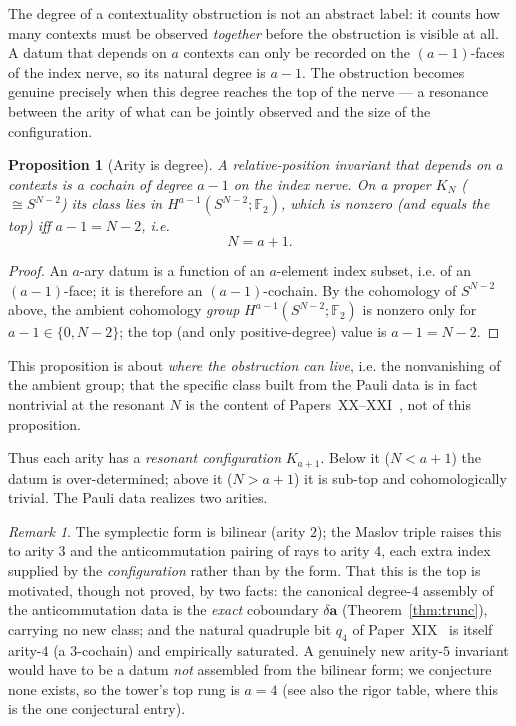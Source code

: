 \documentclass[11pt,a4paper]{article}
\newcommand{\F}{\mathbb{F}}
\theoremstyle{plain}
\newtheorem{proposition}[theorem]{Proposition}
\theoremstyle{definition}
\theoremstyle{remark}
\newtheorem*{remark}{Remark}
\begin{document}
The degree of a contextuality obstruction is not an abstract label: it counts how
many contexts must be observed \emph{together} before the obstruction is visible at
all.  A datum that depends on $a$ contexts can only be recorded on the
$(a-1)$-faces of the index nerve, so its natural degree is $a-1$.  The obstruction
becomes genuine precisely when this degree reaches the top of the nerve --- a
resonance between the arity of what can be jointly observed and the size of the
configuration.

\begin{proposition}[Arity is degree]\label{prop:arity}
A relative-position invariant that depends on $a$ contexts is a cochain of degree
$a-1$ on the index nerve.  On a proper $K_N$ ($\cong S^{N-2}$) its class lies in
$H^{a-1}(S^{N-2};\F_2)$, which is nonzero (and equals the top) iff $a-1=N-2$, i.e.
\[
  N=a+1 .
\]
\end{proposition}

\begin{proof}
An $a$-ary datum is a function of an $a$-element index subset, i.e. of an
$(a-1)$-face; it is therefore an $(a-1)$-cochain.  By the cohomology of
$S^{N-2}$ above, the ambient cohomology \emph{group} $H^{a-1}(S^{N-2};\F_2)$ is
nonzero only for $a-1\in\{0,N-2\}$; the top (and only positive-degree) value is
$a-1=N-2$.
\end{proof}

This proposition is about \emph{where the obstruction can live}, i.e. the
nonvanishing of the ambient group; that the specific class built from the Pauli
data is in fact nontrivial at the resonant $N$ is the content of
Papers~XX--XXI~\cite{PaperXX,PaperXXI}, not of this proposition.

Thus each arity has a \emph{resonant configuration} $K_{a+1}$.  Below it
($N<a+1$) the datum is over-determined; above it ($N>a+1$) it is sub-top and
cohomologically trivial.  The Pauli data realizes two arities.

\begin{remark}
The symplectic form is bilinear (arity $2$); the Maslov triple raises this to
arity $3$ and the anticommutation pairing of rays to arity $4$, each extra index
supplied by the \emph{configuration} rather than by the form.  That this is the top
is motivated, though not proved, by two facts: the canonical degree-$4$ assembly of
the anticommutation data is the \emph{exact} coboundary $\delta\mathbf a$
(Theorem~\ref{thm:trunc}), carrying no new class; and the natural quadruple bit
$q_4$ of Paper~XIX~\cite{PaperXIX} is itself arity-$4$ (a $3$-cochain) and
empirically saturated.  A genuinely new arity-$5$ invariant would have to be a datum
\emph{not} assembled from the bilinear form; we conjecture none exists, so the
tower's top rung is $a=4$ (see also the rigor table, where this is the one
conjectural entry).
\end{remark}
\end{document}
